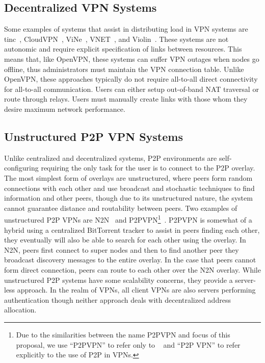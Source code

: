 \subsection{Decentralized VPN Systems}
Some examples of systems that assist in distributing load in VPN systems are
tinc~\cite{tinc}, CloudVPN~\cite{cloudvpn}, ViNe~\cite{vine}, VNET~\cite{vnet},
and Violin~\cite{violin}.  These systems are not autonomic and require explicit
specification of links between resources.  This means that, like OpenVPN, these
systems can suffer VPN outages when nodes go offline, thus administrators must
maintain the VPN connection table.  Unlike OpenVPN, these approaches typically
do not require all-to-all direct connectivity for all-to-all communication.
Users can either setup out-of-band NAT traversal or route through relays.  Users
must manually create links with those whom they desire maximum network
performance.

\subsection{Unstructured P2P VPN Systems}
Unlike centralized and decentralized systems, P2P environments are
self-configuring requiring the only task for the user is to connect to the
P2P overlay.  The most simplest form of overlays are unstructured, where peers
form random connections with each other and use broadcast and stochastic
techniques to find information and other peers, though due to its unstructured
nature, the system cannot guarantee distance and routability between peers.
Two examples of unstructured P2P VPNs are N2N~\cite{n2n} and P2PVPN\footnote{Due
to the similarities between the name P2PVPN and focus of this proposal, we use
``P2PVPN'' to refer only to ~\cite{p2pvpn} and ``P2P VPN'' to refer explicitly
to the use of P2P in VPNs.}~\cite{p2pvpn}.  P2PVPN is somewhat of a hybrid
using a centralized BitTorrent tracker to assist in peers finding each other,
they eventually will also be able to search for each other using the overlay.
In N2N, peers first connect to super nodes and then to find another peer they
broadcast discovery messages to the entire overlay.  In the case that peers
cannot form direct connection, peers can route to each other over the N2N
overlay.  While unstructured P2P systems have some scalability concerns, they
provide a server-less approach.  In the realm of VPNs, all client VPNs are also
servers performing authentication though neither approach deals with
decentralized address allocation.

